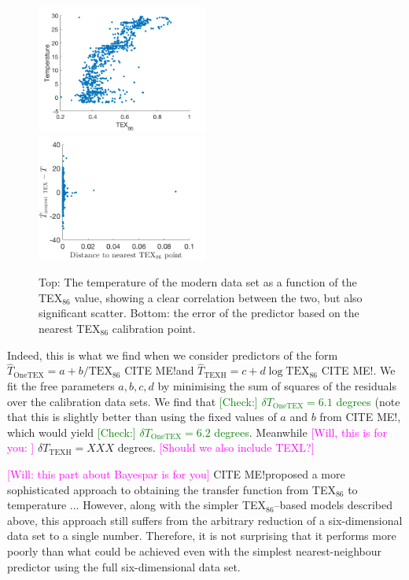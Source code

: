 \documentclass[rmp,aps,twocolumn]{revtex4-1}
\newcommand{\tocheck}[1]{\textcolor{green}{[Check:] #1}}
\newcommand{\citeme}{{\color{blue} CITE ME!}}
\newcommand{\ilya}[1]{\textcolor{magenta}{#1}}
\begin{document}
\begin{figure}
	\centering
	\includegraphics[width=0.5\textwidth]{TEX86.png}
	\includegraphics[width=0.5\textwidth]{TTEX86.png}
	\caption{\label{fig:TEX86}  Top: The temperature of the modern data set as a function of the TEX$_{86}$ value, showing a clear correlation between the two, but also significant scatter.  Bottom: the error of the predictor based on the nearest TEX$_{86}$ calibration point.}
\end{figure}

Indeed, this is what we find when we consider predictors of the form $\hat{T}_\mathrm{OneTEX}  = a + b / \mathrm{TEX}_{86}$ \citeme and $\hat{T}_\mathrm{TEXH}  = c + d \log \mathrm{TEX}_{86}$ \citeme.  We fit the free parameters $a, b, c, d$ by minimising the sum of squares of the residuals over the calibration data sets.  We find that \tocheck{$\delta T_\mathrm{OneTEX} = 6.1$ degrees} (note that this is slightly better than using the fixed values of $a$ and $b$ from \citeme, which would yield \tocheck{$\delta T_\mathrm{OneTEX} = 6.2$ degrees}.  Meanwhile \ilya{[Will, this is for you: ]} $\delta T_\mathrm{TEXH} = XXX$ degrees.  \ilya{[Should we also include TEXL?]}  

\ilya{[Will: this part about Bayespar is for you]} \citeme proposed a more sophisticated approach to obtaining the transfer function from TEX$_{86}$ to temperature ...  However, along with the simpler TEX$_{86}$--based models described above, this approach still suffers from the arbitrary reduction of a six-dimensional data set to a single number.  Therefore, it is not surprising that it performs more poorly than what could be achieved even with the simplest nearest-neighbour predictor using the full six-dimensional data set.
\end{document}
